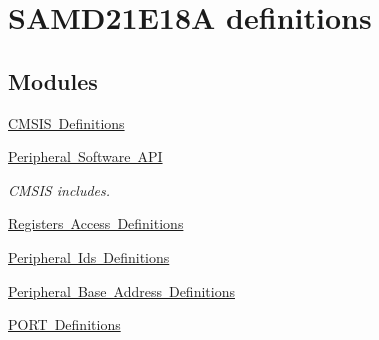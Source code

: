\hypertarget{group___s_a_m_d21_e18_a__definitions}{}\section{S\+A\+M\+D21\+E18A definitions}
\label{group___s_a_m_d21_e18_a__definitions}
\subsection*{Modules}
\begin{DoxyCompactItemize}
\item 
\mbox{\hyperlink{group___s_a_m_d21_e18_a__cmsis}{C\+M\+S\+I\+S Definitions}}
\item 
\mbox{\hyperlink{group___s_a_m_d21_e18_a__api}{Peripheral Software A\+PI}}
\begin{DoxyCompactList}\small\item\em C\+M\+S\+IS includes. \end{DoxyCompactList}\item 
\mbox{\hyperlink{group___s_a_m_d21_e18_a__reg}{Registers Access Definitions}}
\item 
\mbox{\hyperlink{group___s_a_m_d21_e18_a__id}{Peripheral Ids Definitions}}
\item 
\mbox{\hyperlink{group___s_a_m_d21_e18_a__base}{Peripheral Base Address Definitions}}
\item 
\mbox{\hyperlink{group___s_a_m_d21_e18_a__port}{P\+O\+R\+T Definitions}}
\end{DoxyCompactItemize}

